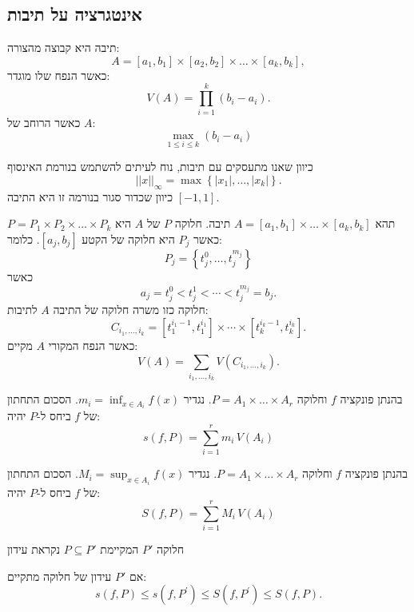\documentclass{tstextbook}
\begin{document}
\subsection{אינטגרציה על תיבות}

\begin{definition}[תיבה]
תיבה היא קבוצה מהצורה:
$$A=[a_{1},b_{1}]\times[a_{2},b_{2}]\times\dots\times[a_{k},b_{k}],$$
כאשר הנפח שלו מוגדר:
$$V(A)=\prod_{i=1}^{k}(b_{i}-a_{i}).$$
כאשר הרוחב של \(A\):
$$\max_{1\leq i\leq k}(b_{i}-a_{i})$$

\end{definition}
כיוון שאנו מתעסקים עם תיבות, נוח לעיתים להשתמש בנורמת האינסוף
$$||x||_{\infty}=\operatorname*{max}\left\{\left|x_{1}\right|,\ldots,\left|x_{k}\right|\right\}.$$
כיוון שכדור סגור בנורמה זו היא התיבה \([-1,1]\).

\begin{definition}[חלוקה]
תהא \(A=[a_{1},b_{1}]\times\dots \times[a_{k},b_{k}]\) תיבה. חלוקה \(P\) של \(A\) היא \(P=P_{1}\times P_{2}\times\dots \times P_{k}\)
כאשר \(P_{j}\) היא חלוקה של הקטע \([a_{j},b_{j}]\). כלומר:
$$P_{j}=\left\{  t_{j}^0,\dots,t_{j}^{m_{j}}  \right\}$$
כאשר $$a_{j}=t_{j}^{0}<t_{j}^{1}<\cdots<t_{j}^{m_{j}}=b_{j}.$$ חלוקה כזו משרה חלוקה של התיבה \(A\) לתיבות:
$$C_{i_{1},\dots,i_{k}}=[t_{1}^{i_{1}-1},t_{1}^{i_{1}}]\times\cdots\times[t_{k}^{i_{k}-1},t_{k}^{i_{k}}].$$
כאשר הנפח המקורי \(A\) מקיים:
$$V(A)=\sum_{i_{1},...,i_{k}}V(C_{i_{1},...,i_{k}}).$$

\end{definition}
\begin{definition}
בהנתן פונקציה \(f\) וחלוקה \(P=A_{1}\times\dots \times A_{r}\). נגדיר \(m_{i}=\inf_{x \in A_{i}}f(x)\). הסכום התחתון של \(f\) ביחס ל-\(P\) יהיה:
$$s(f,P)=\sum_{i=1}^{r}m_{i}\,V(A_{i})$$

\end{definition}
\begin{definition}
בהנתן פונקציה \(f\) וחלוקה \(P=A_{1}\times\dots \times A_{r}\). נגדיר \(M_{i}=\sup_{x \in A_{i}}f(x)\). הסכום התחתון של \(f\) ביחס ל-\(P\) יהיה:
$$S(f,P)=\sum_{i=1}^{r}M_{i}\,V(A_{i})$$

\end{definition}
\begin{definition}
חלוקה \(P'\) המקיימת \(P\subseteq P'\) נקראת עידון

\end{definition}
\begin{proposition}
אם \(P'\) עידון של חלוקה מתקיים:
$$s(f,P)\leq s(f,P^{\prime})\leq S\left(f,P^{\prime}\right)\leq S\left(f,P\right).$$

\end{proposition}
\end{document}
